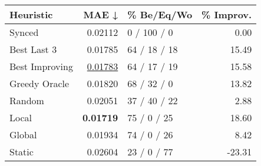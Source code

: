 \begin{tabular}{lrlr}
\toprule
\textbf{Heuristic} & \textbf{MAE ↓} & \textbf{\% Be/Eq/Wo} & \textbf{\% Improv.} \\
\midrule
            Synced &        0.02112 &          0 / 100 / 0 &                0.00 \\
\midrule
       Best Last 3 &        0.01785 &         64 / 18 / 18 &               15.49 \\
    Best Improving &        \underline{0.01783} &         64 / 17 / 19 &               15.58 \\
\addlinespace
     Greedy Oracle &        0.01820 &          68 / 32 / 0 &               13.82 \\
            Random &        0.02051 &         37 / 40 / 22 &                2.88 \\
\midrule
             Local &        \textbf{0.01719} &          75 / 0 / 25 &               18.60 \\
            Global &        0.01934 &          74 / 0 / 26 &                8.42 \\
\midrule
            Static &        0.02604 &          23 / 0 / 77 &              -23.31 \\
\bottomrule
\end{tabular}

\label{tab:non_lr01_le2_bs4_Summary}
